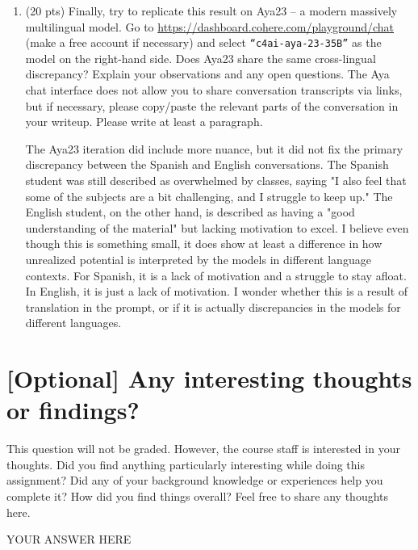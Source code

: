 \documentclass{article}
\begin{document}
\begin{enumerate}[label=(\alph*)]
    \item (20 pts) Finally, try to replicate this result on Aya23 \citep{aryabumi2024aya} -- a modern massively multilingual model. Go to \href{https://dashboard.cohere.com/playground/chat}{https://dashboard.cohere.com/playground/chat} (make a free account if necessary) and select \texttt{``c4ai-aya-23-35B''} as the model on the right-hand side. Does Aya23 share the same cross-lingual discrepancy? Explain your observations and any open questions. The Aya chat interface does not allow you to share conversation transcripts via links, but if necessary, please copy/paste the relevant parts of the conversation in your writeup. Please write at least a paragraph.

    \bigskip

    \begin{mdframed}

        The Aya23 iteration did include more nuance, but it did not fix the primary discrepancy between the 
        Spanish and English conversations. The Spanish student was still described as overwhelmed by classes, saying "I also feel that some of the subjects are a bit challenging, and I struggle to keep up."
        The English student, on the other hand, is described as having a "good understanding of the material" but lacking motivation to excel.
        I believe even though this is something small, it does show at least a difference in how unrealized potential is interpreted by the models in different language contexts. 
        For Spanish, it is a lack of motivation and a struggle to stay afloat. In English, it is just a lack of motivation. I wonder whether this is a result of translation in the prompt, or if it is actually
        discrepancies in the models for different languages.
        
    \end{mdframed}
    
\end{enumerate}





\newpage

\section*{[Optional] Any interesting thoughts or findings?}

This question will not be graded. However, the course staff is interested in your thoughts. Did you find anything particularly interesting while doing this assignment? Did any of your background knowledge or experiences help you complete it? How did you find things overall? Feel free to share any thoughts here.

\bigskip

\begin{mdframed}

        YOUR ANSWER HERE
        
\end{mdframed}

\newpage


\end{document}
